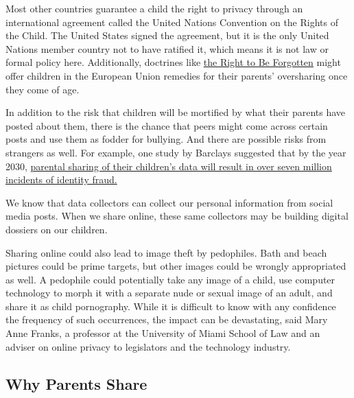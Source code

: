 Most other countries guarantee a child the right to privacy through an
international agreement called the United Nations Convention on the
Rights of the Child. The United States signed the agreement, but it is
the only United Nations member country not to have ratified it, which
means it is not law or formal policy here. Additionally, doctrines like
\href{https://www.washingtonpost.com/news/parenting/wp/2018/07/11/how-europes-right-to-be-forgotten-could-protect-kids-online-privacy-in-the-u-s/?noredirect=on}{the
Right to Be Forgotten} might offer children in the European Union
remedies for their parents' oversharing once they come of age.

In addition to the risk that children will be mortified by what their
parents have posted about them, there is the chance that peers might
come across certain posts and use them as fodder for bullying. And there
are possible risks from strangers as well. For example, one study by
Barclays suggested that by the year 2030,
\href{https://www.bbc.com/news/education-44153754\#:~:text=\%22Sharenting\%22\%20\%2D\%20where\%20parents\%20share,with\%20so\%20much\%20online\%20sharing.}{parental
sharing of their children's data will result in over seven million
incidents of identity fraud.}

We know that data collectors can collect our personal information from
social media posts. When we share online, these same collectors may be
building digital dossiers on our children.

Sharing online could also lead to image theft by pedophiles. Bath and
beach pictures could be prime targets, but other images could be wrongly
appropriated as well. A pedophile could potentially take any image of a
child, use computer technology to morph it with a separate nude or
sexual image of an adult, and share it as child pornography. While it is
difficult to know with any confidence the frequency of such occurrences,
the impact can be devastating, said Mary Anne Franks, a professor at the
University of Miami School of Law and an adviser on online privacy to
legislators and the technology industry.

\hypertarget{why-parents-share}{%
\subsection{Why Parents Share}\label{why-parents-share}}

